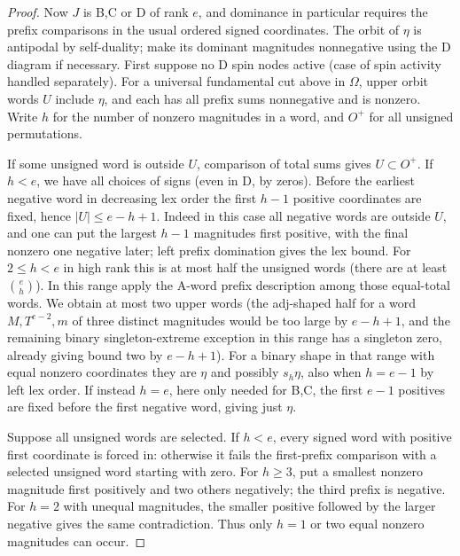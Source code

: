 \begin{proof}
Now \(J\) is B,C or D of rank \(e\), and dominance in particular requires the prefix comparisons in the usual ordered signed coordinates. The orbit of \(\eta\) is antipodal by self-duality; make its dominant magnitudes nonnegative using the D diagram if necessary. First suppose no D spin nodes active (case of spin activity handled separately). For a universal fundamental cut above in \(\Omega\), upper orbit words \(U\) include \(\eta\), and each has all prefix sums nonnegative and is nonzero. Write \(h\) for the number of nonzero magnitudes in a word, and \(O^+\) for all unsigned permutations.

If some unsigned word is outside \(U\), comparison of total sums gives \(U\subset O^+\). If \(h<e\), we have all choices of signs (even in D, by zeros). Before the earliest negative word in decreasing lex order the first \(h-1\) positive coordinates are fixed, hence \(|U|\le e-h+1\). Indeed in this case all negative words are outside \(U\), and one can put the largest \(h-1\) magnitudes first positive, with the final nonzero one negative later; left prefix domination gives the lex bound. For \(2\le h<e\) in high rank this is at most half the unsigned words (there are at least \(\binom eh\)). In this range apply the A-word prefix description among those equal-total words. We obtain at most two upper words (the adj-shaped half for a word \(M,T^{e-2},m\) of three distinct magnitudes would be too large by \(e-h+1\), and the remaining binary singleton-extreme exception in this range has a singleton zero, already giving bound two by \(e-h+1\)). For a binary shape in that range with equal nonzero coordinates they are \(\eta\) and possibly \(s_h\eta\), also when \(h=e-1\) by left lex order. If instead \(h=e\), here only needed for B,C, the first \(e-1\) positives are fixed before the first negative word, giving just \(\eta\).

Suppose all unsigned words are selected. If $h<e$, every signed word
with positive first coordinate is forced in: otherwise it fails the
first-prefix comparison with a selected unsigned word starting with
zero. For $h\ge3$, put a smallest nonzero magnitude first positively
and two others negatively; the third prefix is negative. For $h=2$
with unequal magnitudes, the smaller positive followed by the larger
negative gives the same contradiction. Thus only $h=1$ or two equal
nonzero magnitudes can occur.


\end{proof}
